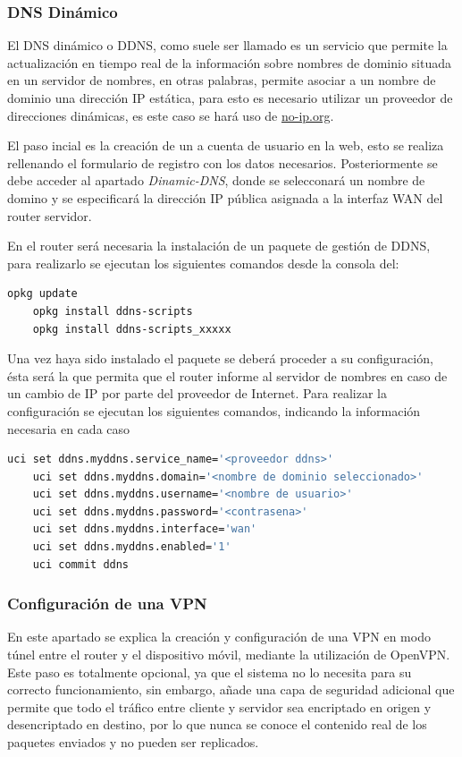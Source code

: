 \documentclass[12pt]{article}
\begin{document}
        \subsubsection{DNS Dinámico}
            El DNS dinámico o DDNS, como suele ser llamado es un servicio que permite la actualización en tiempo real de la información sobre nombres de dominio situada en un servidor de nombres, en otras palabras, permite asociar a un nombre de dominio una dirección IP estática, para esto es necesario utilizar un proveedor de direcciones dinámicas, es este caso se hará uso de \url{no-ip.org}.

            El paso incial es la creación de un a cuenta de usuario en la web, esto se realiza rellenando el formulario de registro con los datos necesarios. Posteriormente se debe acceder al apartado \textit{Dinamic-DNS}, donde se selecconará un nombre de domino y se especificará la dirección IP pública asignada a la interfaz WAN del router servidor.

            En el router será necesaria la instalación de un paquete de gestión de DDNS, para realizarlo se ejecutan los siguientes comandos desde la consola del:

            \begin{lstlisting}[language=bash]
    opkg update
    opkg install ddns-scripts
    opkg install ddns-scripts_xxxxx
            \end{lstlisting}

            Una vez haya sido instalado el paquete se deberá proceder a su configuración, ésta será la que permita que el router informe al servidor de nombres en caso de un cambio de IP por parte del proveedor de Internet. Para realizar la configuración se ejecutan los siguientes comandos, indicando la información necesaria en cada caso
            
            \begin{lstlisting}[language=bash]
    uci set ddns.myddns.service_name='<proveedor ddns>'
    uci set ddns.myddns.domain='<nombre de dominio seleccionado>'
    uci set ddns.myddns.username='<nombre de usuario>'
    uci set ddns.myddns.password='<contrasena>'
    uci set ddns.myddns.interface='wan'
    uci set ddns.myddns.enabled='1'
    uci commit ddns	
            \end{lstlisting}

        \subsubsection{Configuración de una VPN}
            En este apartado se explica la creación y configuración de una VPN en modo túnel entre el router y el dispositivo móvil, mediante la utilización de OpenVPN. Este paso es totalmente opcional, ya que el sistema no lo necesita para su correcto funcionamiento, sin embargo, añade una capa de seguridad adicional que permite que todo el tráfico entre cliente y servidor sea encriptado en origen y desencriptado en destino, por lo que nunca se conoce el contenido real de los paquetes enviados y no pueden ser replicados.
\end{document}
